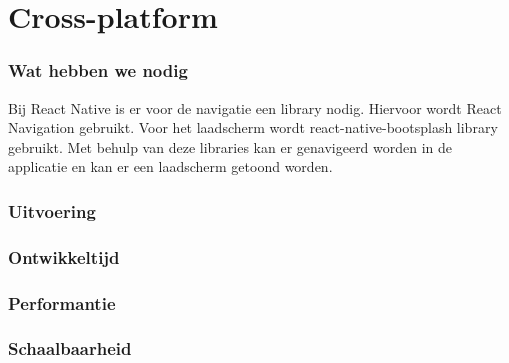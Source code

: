 


\section{Cross-platform}
\subsubsection{Wat hebben we nodig}
Bij React Native is er voor de navigatie een library nodig. Hiervoor wordt
React Navigation gebruikt. Voor het laadscherm wordt react-native-bootsplash library gebruikt. 
Met behulp van deze libraries kan er genavigeerd worden in de applicatie en kan er een laadscherm
getoond worden.

\subsubsection{Uitvoering}



\subsubsection{Ontwikkeltijd}



\subsubsection{Performantie}



\subsubsection{Schaalbaarheid}




